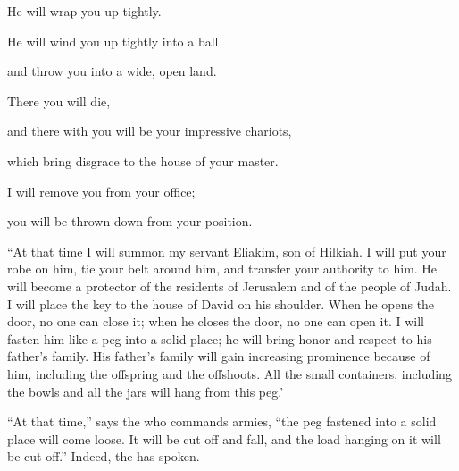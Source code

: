 {\par }{\Q He will wrap
you up
tightly.
\par }{\Q {}He will wind
you up
tightly
into a ball
\par }{\Q and throw
you into
a wide,
open land.
\par }{\Q There
you will die,
\par }{\Q and there
with you will be your impressive
chariots,
\par }{\Q which bring disgrace
to the house
of your master.
\par }{\Q {}I will remove
you from
your office;
\par }{\Q you will be thrown down
from your position.
\par }{\PP {}“At that time
I will summon
my servant
Eliakim,
son
of Hilkiah.
I will put
your robe
on him, tie
your belt
around him, and transfer
your authority
to him.
He will become
a protector
of the residents
of Jerusalem
and of the people
of Judah.
I will place
the key
to the house
of David
on
his shoulder.
When he opens
the door, no
one can close
it; when he closes
the door,
no
one can open it.
I will fasten
him like a peg
into a solid
place;
he will
bring honor
and respect to his father’s
family.
His father’s
family
will gain increasing
prominence
because of him, including the offspring
and the offshoots.
All
the small
containers,
including the bowls
and all
the jars
will hang from this peg.’
\par }{\PP {}“At that
time,”
says
the {}
who commands armies,
“the peg
fastened
into a solid
place
will come loose. It will be cut off
and fall,
and the load
hanging on
it will be cut off.”
Indeed,
the {}
has spoken.

\par }
